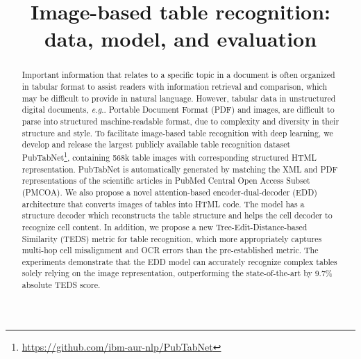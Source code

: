 \documentclass[conference]{IEEEtran}
\makeatletter
\DeclareRobustCommand\onedot{\futurelet\@let@token\@onedot}
\def\@onedot{\ifx\@let@token.\else.\null\fi\xspace}
\def\eg{\emph{e.g}\onedot} \def\Eg{\emph{E.g}\onedot}
\makeatother
\begin{document}
\title{Image-based table recognition: data, model, and evaluation}

\author{
\and
{}
\and
{}
}

\maketitle

\begin{abstract}
  Important information that relates to a specific topic in a document is often
  organized in tabular format to assist readers with information retrieval and
  comparison, which may be difficult to provide in natural language. However,
  tabular data in unstructured digital documents, \eg Portable Document Format
  (PDF) and images, are difficult to parse into structured machine-readable
  format, due to complexity and diversity in their structure and style. To
  facilitate image-based table recognition with deep learning, we develop and
  release the largest publicly available table recognition dataset
  PubTabNet\footnote{\url{https://github.com/ibm-aur-nlp/PubTabNet}}, containing 568k table images with corresponding structured
  HTML representation. PubTabNet is automatically generated by matching the XML
  and PDF representations of the scientific articles in PubMed
  Central\textsuperscript{\tiny\texttrademark} Open Access Subset (PMCOA). We
  also propose a novel attention-based encoder-dual-decoder (EDD) architecture
  that converts images of tables into HTML code. The model has a structure
  decoder which reconstructs the table structure and helps the cell decoder to
  recognize cell content. In addition, we propose a new Tree-Edit-Distance-based
  Similarity (TEDS) metric for table recognition, which more appropriately
  captures multi-hop cell misalignment and OCR errors than the pre-established
  metric. The experiments demonstrate that the EDD model can accurately
  recognize complex tables solely relying on the image representation,
  outperforming the state-of-the-art by 9.7\% absolute TEDS score.
\end{abstract}
\end{document}
